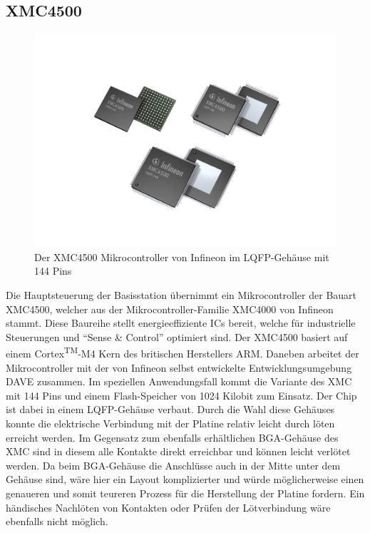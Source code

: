 \subsection{XMC4500}
\begin{figure}[h] %
	\centering
	\includegraphics[width=0.7\linewidth,trim=8cm 4cm 8cm 13cm,clip=true]{"Quellen/New Infineon Controller Family/XMC4500_LQFP-100_LQFP-144_LFBGA-144"}
	\caption{Der XMC4500 Mikrocontroller von Infineon im LQFP-Gehäuse mit 144 Pins \cite{Bauer2012New-Infineon-32}}
	\label{fig:xmc4500}
\end{figure}
Die Hauptsteuerung der Basisstation übernimmt ein Mikrocontroller der Bauart XMC4500, welcher aus der Mikrocontroller-Familie XMC4000 von Infineon stammt. Diese Baureihe stellt energieeffiziente \acp{IC} bereit, welche für industrielle Steuerungen und \enquote{Sense \& Control} optimiert sind. 
Der XMC4500 basiert auf einem  Cortex\textsuperscript{TM}-M4 Kern des britischen Herstellers ARM. Daneben arbeitet der Mikrocontroller mit der von Infineon selbst entwickelte Entwicklungsumgebung DAVE zusammen.
Im speziellen Anwendungsfall kommt die Variante des XMC mit 144 Pins und einem Flash-Speicher von 1024 Kilobit zum Einsatz. Der Chip ist dabei in einem \ac{LQFP}-Gehäuse verbaut. Durch die Wahl diese Gehäuses konnte die elektrische Verbindung mit der Platine relativ leicht durch löten erreicht werden. Im Gegensatz zum ebenfalls erhältlichen \ac{BGA}-Gehäuse des XMC sind in diesem alle Kontakte direkt erreichbar und können leicht verlötet werden. Da beim \ac{BGA}-Gehäuse die Anschlüsse auch in der Mitte unter dem Gehäuse sind, wäre hier ein Layout komplizierter und würde möglicherweise einen genaueren und somit teureren Prozess für die Herstellung der Platine fordern. Ein händisches Nachlöten von Kontakten oder Prüfen der Lötverbindung wäre ebenfalls nicht möglich.



